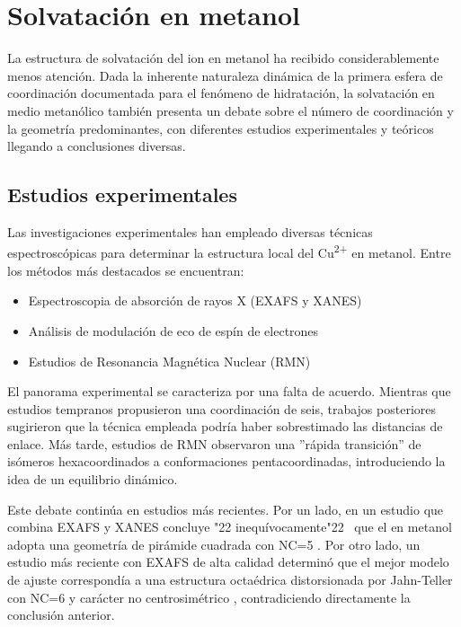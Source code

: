 \section{Solvatación  en metanol}

La estructura de solvatación del ion  en metanol ha recibido considerablemente menos atención. Dada la inherente naturaleza dinámica de la primera esfera de coordinación documentada para el fenómeno de hidratación, la solvatación en medio metanólico también presenta un debate sobre el número de coordinación y la geometría predominantes, con diferentes estudios experimentales y teóricos llegando a conclusiones diversas.

    \subsection{Estudios experimentales}

    Las investigaciones experimentales han empleado diversas técnicas espectroscópicas para determinar la estructura local del Cu\textsuperscript{2+} en metanol. Entre los métodos más destacados se encuentran:
    \begin{itemize}
        \item Espectroscopia de absorción de rayos X (EXAFS y XANES)
        \item Análisis de modulación de eco de espín de electrones
        \item Estudios de Resonancia Magnética Nuclear (RMN)
    \end{itemize}

    El panorama experimental se caracteriza por una falta de acuerdo. Mientras que estudios tempranos \cite{Me-1980-01} propusieron una coordinación de seis, trabajos posteriores sugirieron que la técnica empleada podría haber sobrestimado las distancias de enlace. Más tarde, estudios de RMN \cite{Me-1986-01} observaron una ''rápida transición'' de isómeros hexacoordinados a conformaciones pentacoordinadas, introduciendo la idea de un equilibrio dinámico.

    Este debate continúa en estudios más recientes. Por un lado, en un estudio que combina EXAFS y XANES concluye \char"22 inequívocamente\char"22 \ que el  en metanol adopta una geometría de pirámide cuadrada con NC=5 \cite{Me-2012-01}. Por otro lado, un estudio más reciente con EXAFS de alta calidad determinó que el mejor modelo de ajuste correspondía a una estructura octaédrica distorsionada por Jahn-Teller con NC=6 y carácter no centrosimétrico \cite{Wa-2020-01}, contradiciendo directamente la conclusión anterior.

